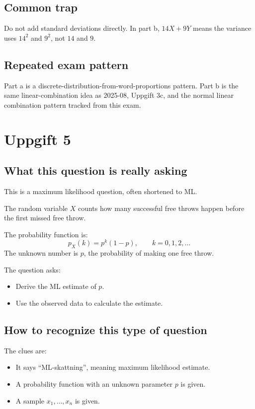 \documentclass[11pt,a4paper]{article}
\begin{document}
\subsection*{Common trap}
Do not add standard deviations directly. In part b, \(14X+9Y\) means the variance uses \(14^2\) and \(9^2\), not \(14\) and \(9\).

\subsection*{Repeated exam pattern}
Part a is a discrete-distribution-from-word-proportions pattern. Part b is the same linear-combination idea as 2025-08, Uppgift 3c, and the normal linear combination pattern tracked from this exam.

\section*{Uppgift 5}

\subsection*{What this question is really asking}
This is a maximum likelihood question, often shortened to ML.

The random variable \(X\) counts how many successful free throws happen before the first missed free throw.

The probability function is:
\[
p_X(k)=p^k(1-p),\qquad k=0,1,2,\ldots
\]
The unknown number is \(p\), the probability of making one free throw.

The question asks:
\begin{itemize}[leftmargin=*]
    \item Derive the ML estimate of \(p\).
    \item Use the observed data to calculate the estimate.
\end{itemize}

\subsection*{How to recognize this type of question}
The clues are:
\begin{itemize}[leftmargin=*]
    \item It says ``ML-skattning'', meaning maximum likelihood estimate.
    \item A probability function with an unknown parameter \(p\) is given.
    \item A sample \(x_1,\ldots,x_n\) is given.
\end{itemize}
\end{document}
